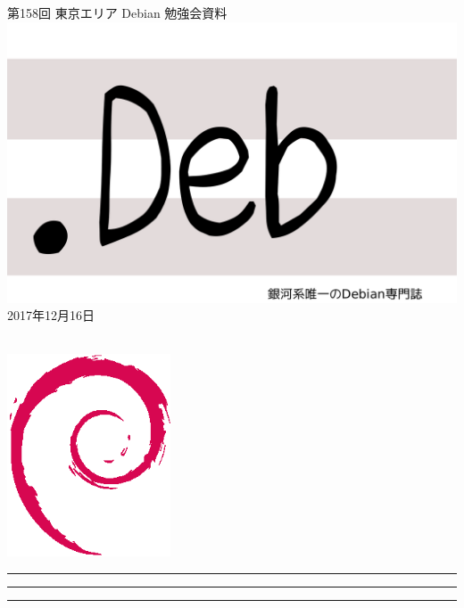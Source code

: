 \documentclass[mingoth,a4paper]{jsarticle}
\newcommand{\debmtgyear}{2017}
\newcommand{\debmtgmonth}{12}
\newcommand{\debmtgdate}{16}
\newcommand{\debmtgnumber}{158}
\begin{document}
\begin{titlepage}
\thispagestyle{empty}

\vspace*{-2cm}
第\debmtgnumber{}回 東京エリア Debian 勉強会資料\\
\hspace*{-2cm}
\includegraphics{image2012-natsu/dotdeb.pdf}\\
\hfill{}\debmtgyear{}年\debmtgmonth{}月\debmtgdate{}日

\\

\vspace*{-2cm}
\hfill{}\includegraphics[height=6cm]{image200502/openlogo-nd.eps}
\end{titlepage}

\newpage

\begin{minipage}[b]{0.2\hsize}
 \colorbox{titleback}{}
\end{minipage}
\begin{minipage}[b]{0.8\hsize}
\hrule
\vspace{2mm}
\hrule
\begin{multicols}{2}
\tableofcontents
\end{multicols}
\vspace{2mm}
\hrule
\end{minipage}
\end{document}
